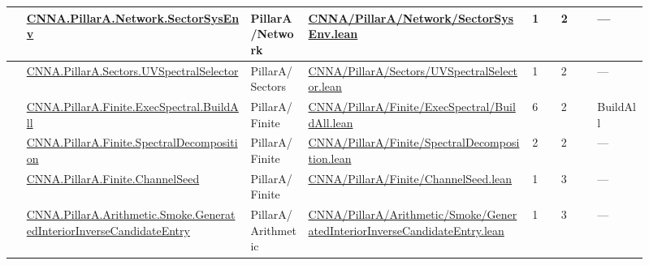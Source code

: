 \begin{longtable}{L{0.025\linewidth} L{0.315\linewidth} L{0.08\linewidth} L{0.315\linewidth} L{0.045\linewidth} L{0.055\linewidth} L{0.07\linewidth}}
\hline
{} & \href{run:repo_snapshot/CNNA/PillarA/Network/SectorSysEnv.lean}{CNNA.\allowbreak{}PillarA.\allowbreak{}Network.\allowbreak{}SectorSysEnv} & PillarA/\allowbreak{}Network & \href{run:repo_snapshot/CNNA/PillarA/Network/SectorSysEnv.lean}{CNNA/\allowbreak{}PillarA/\allowbreak{}Network/\allowbreak{}SectorSysEnv.\allowbreak{}lean} & 1 & 2 & ---\\
\hline
{} & \href{run:repo_snapshot/CNNA/PillarA/Sectors/UVSpectralSelector.lean}{CNNA.\allowbreak{}PillarA.\allowbreak{}Sectors.\allowbreak{}UVSpectralSelector} & PillarA/\allowbreak{}Sectors & \href{run:repo_snapshot/CNNA/PillarA/Sectors/UVSpectralSelector.lean}{CNNA/\allowbreak{}PillarA/\allowbreak{}Sectors/\allowbreak{}UVSpectralSelector.\allowbreak{}lean} & 1 & 2 & ---\\
\hline
{} & \href{run:repo_snapshot/CNNA/PillarA/Finite/ExecSpectral/BuildAll.lean}{CNNA.\allowbreak{}PillarA.\allowbreak{}Finite.\allowbreak{}ExecSpectral.\allowbreak{}BuildAll} & PillarA/\allowbreak{}Finite & \href{run:repo_snapshot/CNNA/PillarA/Finite/ExecSpectral/BuildAll.lean}{CNNA/\allowbreak{}PillarA/\allowbreak{}Finite/\allowbreak{}ExecSpectral/\allowbreak{}BuildAll.\allowbreak{}lean} & 6 & 2 & BuildAll\\
\hline
{} & \href{run:repo_snapshot/CNNA/PillarA/Finite/SpectralDecomposition.lean}{CNNA.\allowbreak{}PillarA.\allowbreak{}Finite.\allowbreak{}SpectralDecomposition} & PillarA/\allowbreak{}Finite & \href{run:repo_snapshot/CNNA/PillarA/Finite/SpectralDecomposition.lean}{CNNA/\allowbreak{}PillarA/\allowbreak{}Finite/\allowbreak{}SpectralDecomposition.\allowbreak{}lean} & 2 & 2 & ---\\
\hline
{} & \href{run:repo_snapshot/CNNA/PillarA/Finite/ChannelSeed.lean}{CNNA.\allowbreak{}PillarA.\allowbreak{}Finite.\allowbreak{}ChannelSeed} & PillarA/\allowbreak{}Finite & \href{run:repo_snapshot/CNNA/PillarA/Finite/ChannelSeed.lean}{CNNA/\allowbreak{}PillarA/\allowbreak{}Finite/\allowbreak{}ChannelSeed.\allowbreak{}lean} & 1 & 3 & ---\\
\hline
{} & \href{run:repo_snapshot/CNNA/PillarA/Arithmetic/Smoke/GeneratedInteriorInverseCandidateEntry.lean}{CNNA.\allowbreak{}PillarA.\allowbreak{}Arithmetic.\allowbreak{}Smoke.\allowbreak{}GeneratedInteriorInverseCandidateEntry} & PillarA/\allowbreak{}Arithmetic & \href{run:repo_snapshot/CNNA/PillarA/Arithmetic/Smoke/GeneratedInteriorInverseCandidateEntry.lean}{CNNA/\allowbreak{}PillarA/\allowbreak{}Arithmetic/\allowbreak{}Smoke/\allowbreak{}GeneratedInteriorInverseCandidateEntry.\allowbreak{}lean} & 1 & 3 & ---\\

\end{longtable}
